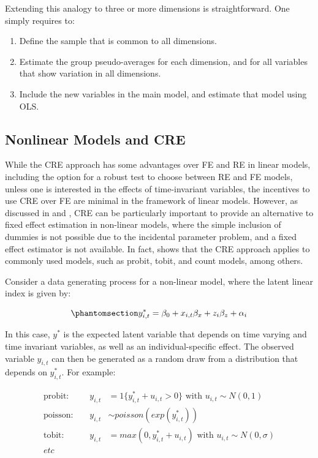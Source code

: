 \documentclass[bib]{statapress}
\providecommand{\tightlist}{%
  \setlength{\itemsep}{0pt}\setlength{\parskip}{0pt}}\usepackage{longtable,booktabs,array}
\begin{document}
Extending this analogy to three or more dimensions is straightforward.
One simply requires to:

\begin{enumerate}
\def\labelenumi{\arabic{enumi}.}
\tightlist
\item
  Define the sample that is common to all dimensions.
\item
  Estimate the group pseudo-averages for each dimension, and for all
  variables that show variation in all dimensions.
\item
  Include the new variables in the main model, and estimate that model
  using OLS.
\end{enumerate}

\subsection{Nonlinear Models and CRE}\label{nonlinear-models-and-cre}

While the CRE approach has some advantages over FE and RE in linear
models, including the option for a robust test to choose between RE and
FE models, unless one is interested in the effects of time-invariant
variables, the incentives to use CRE over FE are minimal in the
framework of linear models. However, as discussed in
\citet{wooldridge2019} and \citet{wooldridge2023}, CRE can be
particularly important to provide an alternative to fixed effect
estimation in non-linear models, where the simple inclusion of dummies
is not possible due to the incidental parameter problem, and a fixed
effect estimator is not available. In fact,
\citet{wooldridge2010econometric} shows that the CRE approach applies to
commonly used models, such as probit, tobit, and count models, among
others.

Consider a data generating process for a non-linear model, where the
latent linear index is given by:

\begin{equation}\phantomsection\label{eq-nl-1}{y^*_{i,t} = \beta_0 + x_{i,t}\beta_x + z_{i}\beta_z + \alpha_i \\
}\end{equation}

In this case, \(y^*\) is the expected latent variable that depends on
time varying and time invariant variables, as well as an
individual-specific effect. The observed variable \(y_{i,t}\) can then
be generated as a random draw from a distribution that depends on
\(y^*_{i,t}\). For example:

\[\begin{aligned}
\text{probit: } && y_{i,t} &= 1\{y^*_{i,t}+u_{i,t}>0\} \text{ with } u_{i,t}\sim N(0,1) \\ 
\text{poisson: } && y_{i,t} & \sim  poisson(exp(y^*_{i,t})) \\
\text{tobit: } && y_{i,t} &= max(0, y^*_{i,t}+u_{i,t}) \text{ with } u_{i,t}\sim N(0,\sigma) \\
etc
\end{aligned}
\]
\end{document}
